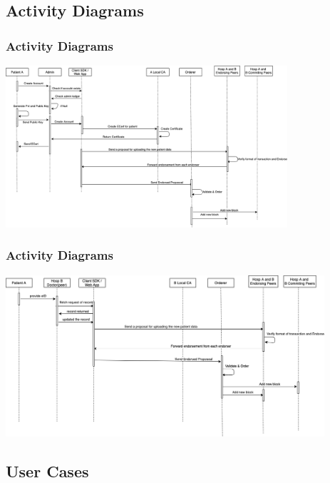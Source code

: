\documentclass[english,hangout]{beamer}
\begin{document}
\subsection{Activity Diagrams}

\begin{frame}
  \frametitle{Activity Diagrams}
\begin{center}
        \vspace{-1.2em}
            \includegraphics[height=6cm]{first.png}
        \end{center}
        \vspace{-3mm}

\end{frame}

\begin{frame}
  \frametitle{Activity Diagrams}
\begin{center}
        \vspace{-1.2em}
            \includegraphics[height=6cm]{second.png}
        \end{center}
        \vspace{-3mm}

\end{frame}

\subsection{User Cases}
\end{document}
